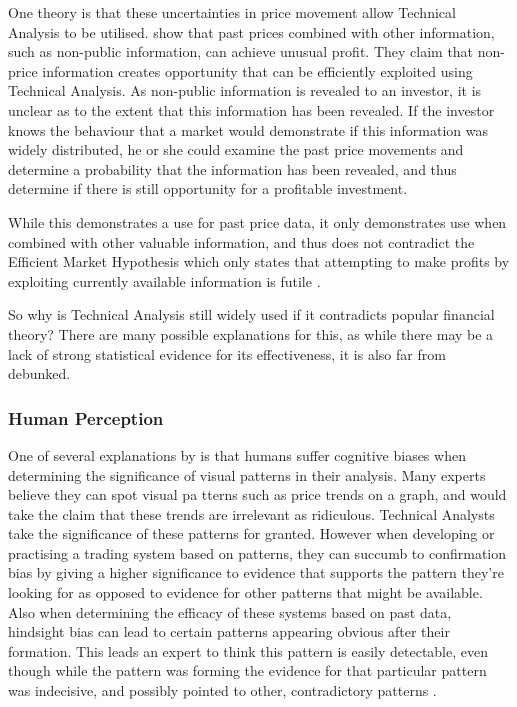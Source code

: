 \documentclass{article}
\theoremstyle{definition}
\begin{document}
One theory is that these uncertainties in price movement allow Technical Analysis to be utilised. \cite{indefenseof} show that past prices combined with other information, such as non-public information, can achieve unusual profit. They claim that non-price information creates opportunity that can be efficiently exploited using Technical Analysis. As non-public information is revealed to an investor, it is unclear as to the extent that this information has been revealed. If the investor knows the behaviour that a market would demonstrate if this information was widely distributed, he or she could examine the past price movements and determine a probability that the information has been revealed, and thus determine if there is still opportunity for a profitable investment.

While this demonstrates a use for past price data, it only demonstrates use when combined with other valuable information, and thus does not contradict the Efficient Market Hypothesis which only states that attempting to make profits by exploiting currently available information is futile \citep{taprofitability}.

So why is Technical Analysis still widely used if it contradicts popular financial theory? There are many possible explanations for this, as while there may be a lack of strong statistical evidence for its effectiveness, it is also far from debunked. 	

\subsubsection{Human Perception}

One of several explanations by \cite[p.45-71]{aronson2011evidence} is that humans suffer cognitive biases when determining the significance of visual patterns in their analysis. Many experts believe they can spot visual pa	tterns such as price trends on a graph, and would take the claim that these trends are irrelevant as ridiculous. Technical Analysts take the significance of these patterns for granted. However when developing or practising a trading system based on patterns, they can succumb to confirmation bias by giving a higher significance to evidence that supports the pattern they're looking for as opposed to evidence for other patterns that might be available. Also when determining the efficacy of these systems based on past data, hindsight bias can lead to certain patterns appearing obvious after their formation. This leads an expert to think this pattern is easily detectable, even though while the pattern was forming the evidence for that particular pattern was indecisive, and possibly pointed to other, contradictory patterns \cite[p.62]{aronson2011evidence}.
\end{document}
